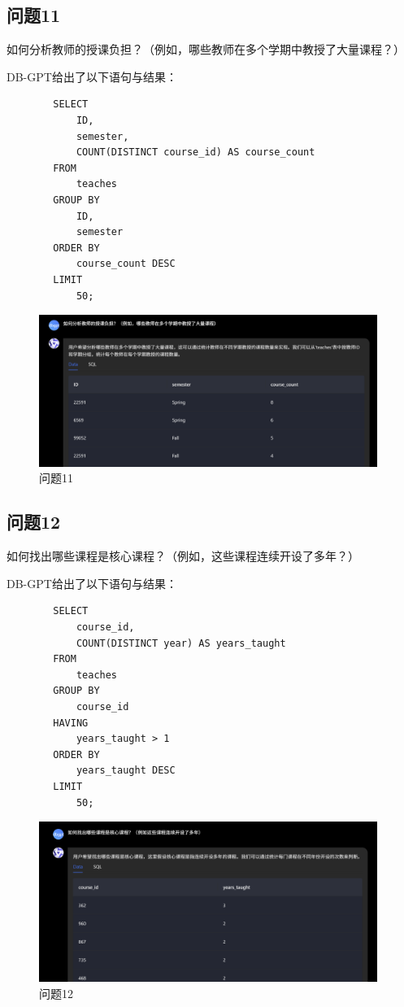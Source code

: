 \documentclass{article}
\begin{document}
	\subsection{问题11}
	如何分析教师的授课负担？（例如，哪些教师在多个学期中教授了大量课程？）
	
	DB-GPT给出了以下语句与结果：
	
	\begin{verbatim}
		SELECT
			ID,
			semester,
			COUNT(DISTINCT course_id) AS course_count
		FROM
			teaches
		GROUP BY
			ID,
			semester
		ORDER BY
			course_count DESC
		LIMIT
			50;
	\end{verbatim}
	
	\begin{figure}[H]
		\centering
		\includegraphics[width=11cm]{./images/33.问题11.png}
		\caption{问题11}
	\end{figure}
	
	\subsection{问题12}
	如何找出哪些课程是核心课程？（例如，这些课程连续开设了多年？）
	
	DB-GPT给出了以下语句与结果：
	
	\begin{verbatim}
		SELECT
			course_id,
			COUNT(DISTINCT year) AS years_taught
		FROM
			teaches
		GROUP BY
			course_id
		HAVING
			years_taught > 1
		ORDER BY
			years_taught DESC
		LIMIT
			50;
	\end{verbatim}
	
	\begin{figure}[H]
		\centering
		\includegraphics[width=11cm]{./images/34.问题12.png}
		\caption{问题12}
	\end{figure}
	
\end{document}
